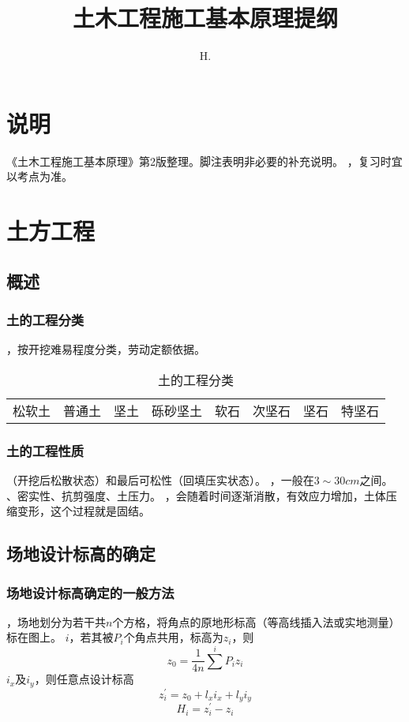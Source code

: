 \documentclass{book}
\begin{document}
\frontmatter
\title{土木工程施工基本原理提纲}
\author{H.}
\maketitle
\tableofcontents
\chapter{说明}
《土木工程施工基本原理》第2版整理。脚注表明非必要的补充说明。
，复习时宜以考点为准。
\mainmatter
\chapter{土方工程}
\section{概述}
\subsection{土的工程分类}
，按开挖难易程度分类，劳动定额依据。
\begin{table}[htbp]
    \caption{土的工程分类}
    \begin{center}
        \begin{tabular}{cccccccc}
            松软土 & 普通土 & 坚土 & 砾砂坚土 & 软石 & 次坚石 & 坚石 & 特坚石
        \end{tabular}
    \end{center}
\end{table}
\subsection{土的工程性质}
（开挖后松散状态）和最后可松性（回填压实状态）。
，一般在$3\sim30cm$之间。
、密实性、抗剪强度、土压力。
，会随着时间逐渐消散，有效应力增加，土体压缩变形，这个过程就是固结。
\section{场地设计标高的确定}
\subsection{场地设计标高确定的一般方法}
，场地划分为若干共$n$个方格，将角点的原地形标高（等高线插入法或实地测量）标在图上。
$i$，若其被$P_i$个角点共用，标高为$z_i$，则
$$
    z_0  = \frac{1}{4n} \sum^i P_i z_i
$$
$i_x$及$i_y$，则任意点设计标高
$$
    z_i^{\prime} = z_0 + l_xi_x + l_yi_y
$$
$$
    H_i = z_i^{\prime} - z_i
$$
\end{document}
